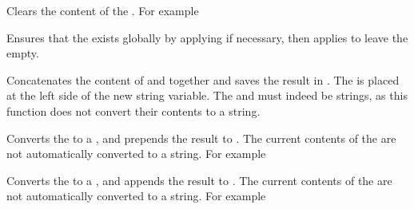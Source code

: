 \documentclass[oneside]{book}
\begin{document}
\begin{function}{\StrClear}
\begin{syntax}
 
\end{syntax}
Clears the content of the . For example
\begin{demohigh}
\StrSet {}
\StrClear \lTmpjStr
\StrSet {}
\StrUse \lTmpjStr
\end{demohigh}
\end{function}

\begin{function}{\StrClearNew}
\begin{syntax}
 
\end{syntax}
Ensures that the  exists globally by applying
 if necessary, then applies  to leave
the  empty.
\end{function}

\begin{function}{\StrConcat}
\begin{syntax}
   
\end{syntax}
Concatenates the content of  and 
together and saves the result in . The 
is placed at the left side of the new string variable.
The  and  must indeed be strings, as
this function does not convert their contents to a string.
\end{function}

\begin{function}{\StrPutLeft}
\begin{syntax}
  
\end{syntax}
Converts the  to a , and prepends the
result to .  The current contents of the  are not automatically converted to a string. For example
\begin{demohigh}
\StrSet {}
\StrPutLeft {}
\StrUse \lTmpkStr
\end{demohigh}
\end{function}

\begin{function}{\StrPutRight}
\begin{syntax}
  
\end{syntax}
Converts the  to a , and appends the
result to .  The current contents of the  are not automatically converted to a string. For example
\begin{demohigh}
\StrSet {}
\StrPutRight {}
\StrUse \lTmpkStr
\end{demohigh}
\end{function}
\end{document}
